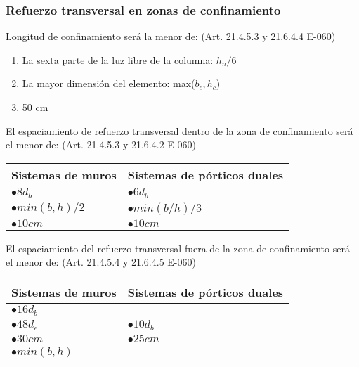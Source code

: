 \documentclass[12pt]{article}
\begin{document}
        \subsubsection{Refuerzo transversal en zonas de confinamiento}
        Longitud de confinamiento será la menor de: (Art. 21.4.5.3 y 21.6.4.4 E-060)
        \begin{enumerate}
            \item La sexta parte de la luz libre de la columna: $h_n/6$
            \item La mayor dimensión del elemento: max($b_c,h_c$)
            \item 50 cm
        \end{enumerate}
        El espaciamiento de refuerzo transversal dentro de la zona de confinamiento será el menor de: (Art. 21.4.5.3 y 21.6.4.2 E-060)

        \begin{center}
            \begin{tabular}{ll}
                \hline
                Sistemas de muros & Sistemas de pórticos duales \\
                \hline
                $\bullet 8d_b$ & $\bullet 6d_b$ \\
                $\bullet min(b,h)/2$ & $\bullet min(b/h)/3$ \\
                $\bullet 10 cm$ & $\bullet 10 cm$ \\
                \hline
            \end{tabular}
        \end{center}

        El espaciamiento del refuerzo transversal fuera de la zona de confinamiento será el menor de: (Art. 21.4.5.4 y 21.6.4.5 E-060)

       \begin{center}
            \begin{tabular}{ll}
                \hline
                Sistemas de muros & Sistemas de pórticos duales \\
                \hline
                $\bullet 16d_b$ &  \\
                $\bullet 48d_e$ & $\bullet 10d_b$ \\
                $\bullet 30 cm$ & $\bullet 25 cm$ \\
                $\bullet min(b,h)$  \\
                \hline
            \end{tabular}
        \end{center}
\end{document}
